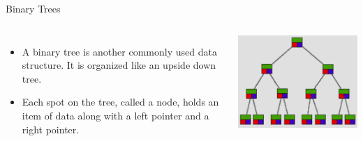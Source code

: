 \documentclass{beamer}
\begin{document}
\begin{frame}{Binary Trees}
\begin{columns}[c]
\begin{itemize}
\item A binary tree is another commonly used data structure. It is organized like an upside down tree. 
\item Each spot on the tree, called a node, holds an item of data along with a left pointer and a right pointer. 
\end{itemize}
\includegraphics[width=1.0\textwidth]{../imgs/binary-tree-color.png}
\end{columns}
\end{frame}
\end{document}
